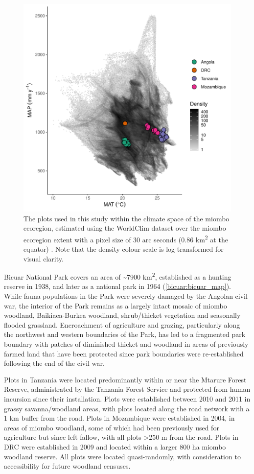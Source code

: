 \begin{refsection}
\begin{figure}
	\includegraphics[width=0.8\linewidth]{img/temp_precip}
	\caption[Plots in climate space of miombo ecoregion]{The plots used in this study within the climate space of the miombo ecoregion, estimated using the WorldClim dataset over the miombo ecoregion extent with a pixel size of 30 arc seconds (0.86 km\textsuperscript{2} at the equator) \citep{Fick2017}. Note that the density colour scale is log-transformed for visual clarity.}
	\label{bicuar:temp_precip}
\end{figure}



Bicuar National Park covers an area of \textasciitilde{}7900 km\textsuperscript{2}, established as a hunting reserve in 1938, and later as a national park in 1964 (\autoref{bicuar:bicuar_map}). While fauna populations in the Park were severely damaged by the Angolan civil war, the interior of the Park remains as a largely intact mosaic of miombo woodland, Baikiaea-Burkea woodland, shrub/thicket vegetation and seasonally flooded grassland. Encroachment of agriculture and grazing, particularly along the northwest and western boundaries of the Park, has led to a fragmented park boundary with patches of diminished thicket and woodland in areas of previously farmed land that have been protected since park boundaries were re-established following the end of the civil war.

Plots in Tanzania were located predominantly within or near the Mtarure Forest Reserve, administrated by the Tanzania Forest Service and protected from human incursion since their installation. Plots were established between 2010 and 2011 in grassy savanna/woodland areas, with plots located along the road network with a 1 km buffer from the road. Plots in Mozambique were established in 2004, in areas of miombo woodland, some of which had been previously used for agriculture but since left fallow, with all plots >250 m from the road. Plots in DRC were established in 2009 and located within a larger 800 ha miombo woodland reserve. All plots were located quasi-randomly, with consideration to accessibility for future woodland censuses.


\end{refsection}
